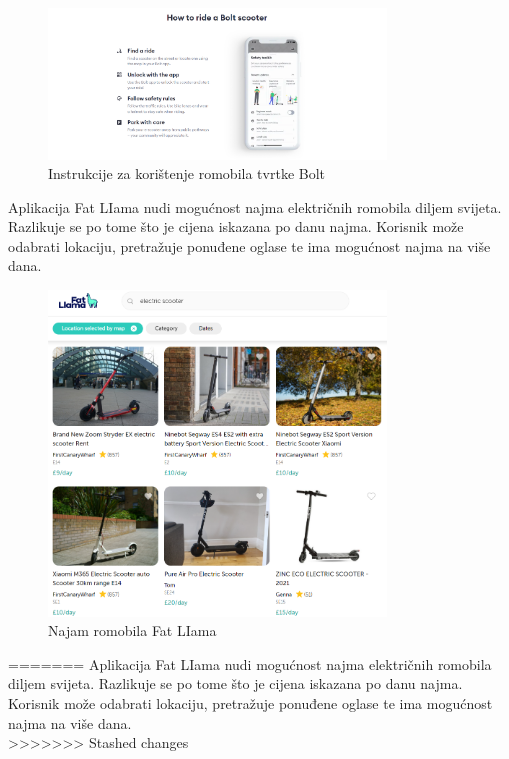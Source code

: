 		\begin{figure}[t]
			\centering
			\includegraphics[width=0.8\textwidth]{slike/bolt-2.png}
			\caption{Instrukcije za korištenje romobila tvrtke Bolt}
			\label{fig:bolt-2}
		\end{figure}
		
		\indent Aplikacija Fat LIama nudi mogućnost najma električnih romobila diljem svijeta. Razlikuje se po tome što je cijena iskazana po danu najma. Korisnik može odabrati lokaciju, pretražuje ponuđene oglase te ima mogućnost najma na više dana.\\
		
		\begin{figure}[t]
			\centering
			\includegraphics[width=0.8\textwidth]{slike/fat-liam.png}
			\caption{Najam romobila Fat LIama}
			\label{fig:fat-liama}
		\end{figure}
		
		
=======
		\indent Aplikacija Fat LIama nudi mogućnost najma električnih romobila diljem svijeta. Razlikuje se po tome što je cijena iskazana po danu najma. Korisnik može odabrati lokaciju, pretražuje ponuđene oglase te ima mogućnost najma na više dana.\\

>>>>>>> Stashed changes
		
		
		
		
	